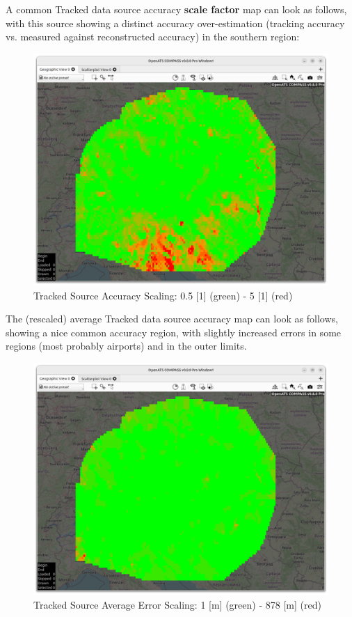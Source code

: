 \begin{itemize}
A common Tracked data source accuracy \textbf{scale factor} map can look as follows, 
with this source showing a distinct accuracy over-estimation (tracking accuracy vs. measured against reconstructed accuracy) in the southern region:
\begin{figure}[H]
    \hspace*{-2.5cm}
    \includegraphics[width=19cm]{figures/tracked_scaling.png}
  \caption{Tracked Source Accuracy Scaling: 0.5 [1] (green) - 5 [1] (red)}
\end{figure} 

The (rescaled) average Tracked data source accuracy map can look as follows, 
showing a nice common accuracy region, with slightly increased errors in some regions (most probably airports) and in the outer limits.
\begin{figure}[H]
    \hspace*{-2.5cm}
    \includegraphics[width=19cm]{figures/tracked_avgerr.png}
  \caption{Tracked Source Average Error Scaling: 1 [m] (green) - 878 [m] (red)}
\end{figure} 


\end{itemize}
